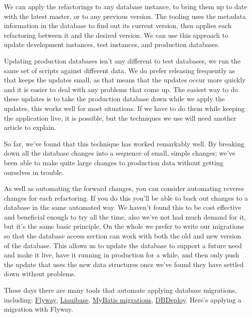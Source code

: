 \documentclass[12pt]{article}
\begin{document}
We can apply the refactorings to any database instance, to bring them up
to date with the latest master, or to any previous version. The tooling
uses the metadata information in the database to find out its current
version, then applies each refactoring between it and the desired
version. We can use this approach to update development instances, test
instances, and production databases.

Updating production databases isn't any different to test databases, we
run the same set of scripts against different data. We do prefer
releasing frequently as that keeps the updates small, as that means that
the updates occur more quickly and it is easier to deal with any
problems that come up. The easiest way to do these updates is to take
the production database down while we apply the updates, this works well
for most situations. If we have to do them while keeping the application
live, it is possible, but the techniques we use will need another
article to explain.

So far, we've found that this technique has worked remarkably well. By
breaking down all the database changes into a sequence of small, simple
changes; we've been able to make quite large changes to production data
without getting ourselves in trouble.

As well as automating the forward changes, you can consider automating
reverse changes for each refactoring. If you do this you'll be able to
back out changes to a database in the same automated way. We haven't
found this to be cost effective and beneficial enough to try all the
time, also we've not had much demand for it, but it's the same basic
principle. On the whole we prefer to write our migrations so that the
database access section can work with both the old and new version of
the database. This allows us to update the database to support a future
need and make it live, have it running in production for a while, and
then only push the update that uses the new data structures once we've
found they have settled down without problems.

These days there are many tools that automate applying database
migrations, including: \href{http://flywaydb.org}{Flyway},
\href{http://liquibase.org}{Liquibase},
\href{https://github.com/mybatis/migrations}{MyBatis migrations},
\href{http://dbdeploy.com}{DBDeploy}. Here's applying a migration with
Flyway.
\end{document}
